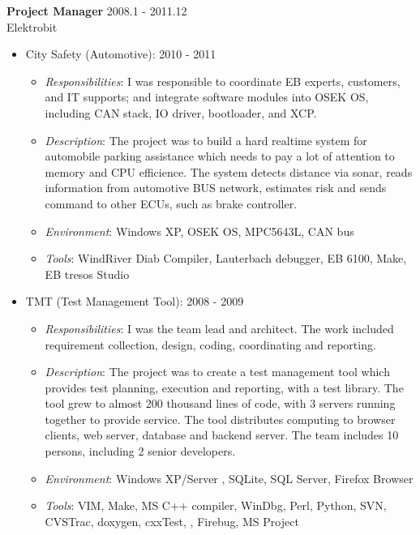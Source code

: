 \textbf{Project Manager} \hfill 2008.1 - 2011.12\\
        Elektrobit
        \begin{itemize}  \itemsep -2pt %
            \item City Safety (Automotive): 2010 - 2011
                \begin{itemize} 
                    \item {\em Responsibilities}:
                    I was responsible to coordinate EB experts, customers, and IT supports;
                    and integrate software modules into OSEK OS,
                    including CAN stack, IO driver, bootloader, and XCP.
                    \item {\em Description}:
                    The project was to build a hard realtime system
                    for automobile parking assistance
                    which needs to pay a lot of attention to memory and CPU efficience.
                    The system detects distance via sonar, reads information from automotive BUS network,
                    estimates risk and sends command to other ECUs, such as brake controller.
                    \item {\em Environment}:
                    Windows XP, OSEK OS, MPC5643L, CAN bus
                    \item {\em Tools}:
                    WindRiver Diab Compiler, Lauterbach debugger, EB 6100, Make, EB tresos Studio
                \end{itemize}
            \item TMT (Test Management Tool): 2008 - 2009
                \begin{itemize} 
                    \item {\em Responsibilities}:
                    I was the team lead and architect.
                    The work included requirement collection, design, coding, coordinating and reporting.
                    \item {\em Description}:
                    The project was to create a test management tool
                    which provides test planning, execution and reporting, with a test library.
                    The tool grew to almost 200 thousand lines of code,
                    with 3 servers running together to provide service.
                    The tool distributes computing to browser clients, web server, database and backend server.
                    The team includes 10 persons, including 2 senior developers.
                    \item {\em Environment}:
                    Windows XP/Server , SQLite, SQL Server, Firefox Browser
                    \item {\em Tools}:
                    VIM, Make, MS C++ compiler, WinDbg, Perl, Python, SVN, CVSTrac, doxygen, cxxTest, , Firebug, MS Project
                \end{itemize}
        \end{itemize}
 
